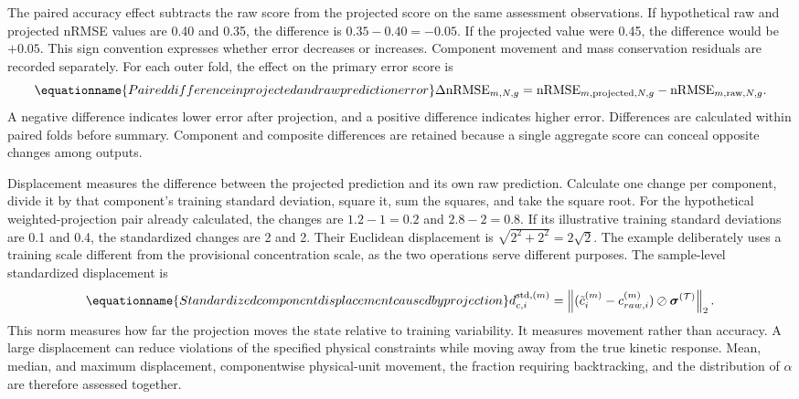 The paired accuracy effect subtracts the raw score from the projected score on the same assessment observations. If hypothetical raw and projected nRMSE values are 0.40 and 0.35, the difference is $0.35-0.40=-0.05$. If the projected value were 0.45, the difference would be $+0.05$. This sign convention expresses whether error decreases or increases. Component movement and mass conservation residuals are recorded separately. For each outer fold, the effect on the primary error score is
\begin{equation}
\equationname{Paired difference in projected and raw prediction error}
\Delta\mathrm{nRMSE}_{m,N,g}=
\mathrm{nRMSE}_{m,\mathrm{projected},N,g}
-\mathrm{nRMSE}_{m,\mathrm{raw},N,g}.
\label{eq:projection_paired_error_difference}
\end{equation}
A negative difference indicates lower error after projection, and a positive difference indicates higher error. Differences are calculated within paired folds before summary. Component and composite differences are retained because a single aggregate score can conceal opposite changes among outputs.

Displacement measures the difference between the projected prediction and its own raw prediction. Calculate one change per component, divide it by that component's training standard deviation, square it, sum the squares, and take the square root. For the hypothetical weighted-projection pair already calculated, the changes are $1.2-1=0.2$ and $2.8-2=0.8$. If its illustrative training standard deviations are 0.1 and 0.4, the standardized changes are 2 and 2. Their Euclidean displacement is $\sqrt{2^2+2^2}=2\sqrt2$. The example deliberately uses a training scale different from the provisional concentration scale, as the two operations serve different purposes. The sample-level standardized displacement is
\begin{equation}
\equationname{Standardized component displacement caused by projection}
d_{c,i}^{\mathrm{std},(m)}=
\left\|(\tilde c_i^{(m)}-c_{raw,i}^{(m)})
\oslash\boldsymbol{\sigma}^{(\mathcal{T})}\right\|_2.
\label{eq:projection_standardized_displacement}
\end{equation}
This norm measures how far the projection moves the state relative to training variability. It measures movement rather than accuracy. A large displacement can reduce violations of the specified physical constraints while moving away from the true kinetic response. Mean, median, and maximum displacement, componentwise physical-unit movement, the fraction requiring backtracking, and the distribution of $\alpha$ are therefore assessed together.

